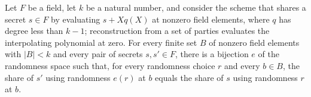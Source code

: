 \begin{theorem}
\label{TCSlib.Shamir.perfectPrivacy}
\leanok
{}
Let $F$ be a field, let $k$ be a natural number, and consider the scheme that shares a
secret $s\in F$ by evaluating $s+Xq(X)$ at nonzero field elements, where $q$ has degree
less than $k-1$; reconstruction from a set of parties evaluates the interpolating
polynomial at zero. For every finite set $B$ of nonzero field elements with $|B|<k$ and
every pair of secrets $s,s'\in F$, there is a bijection $e$ of the randomness space such
that, for every randomness choice $r$ and every $b\in B$, the share of $s'$ using
randomness $e(r)$ at $b$ equals the share of $s$ using randomness $r$ at $b$.
\end{theorem}


